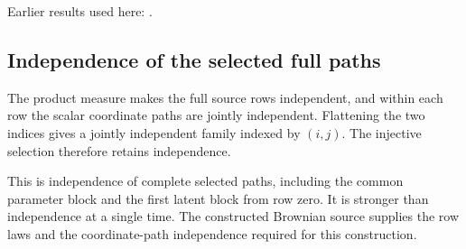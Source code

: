 \documentclass[11pt,a4paper]{report}
\begin{document}
Earlier results used here: \cite[Section~3.32.1]{LangevinLean2026ULASC}.
\subsection{\texorpdfstring{Independence of the selected full paths}{Independence of the selected full paths}}
\label{report-step-ProximalLangevin-MeanFieldBrownianFamily-lean-3}


The product measure makes the full source rows independent, and within each row the scalar coordinate paths are jointly independent. Flattening the two indices gives a jointly independent family indexed by \((i,j)\). The injective selection therefore retains independence.



This is independence of complete selected paths, including the common parameter block and the first latent block from row zero. It is stronger than independence at a single time. The constructed Brownian source supplies the row laws and the coordinate-path independence required for this construction.
\end{document}
